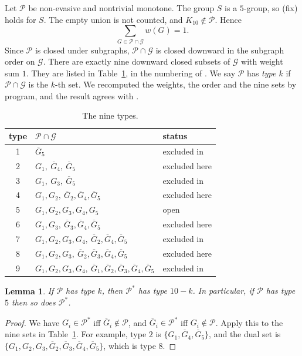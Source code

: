 \documentclass[11pt]{article}
\theoremstyle{plain}
\newtheorem{lemma}[theorem]{Lemma}
\theoremstyle{definition}
\theoremstyle{remark}
\newcommand{\PP}{\mathcal P}
\begin{document}
Let $\PP$ be non-evasive and nontrivial monotone.
The group $S$ is a $5$-group, so (fix) holds for $S$.
The empty union is not counted, and $K_{10}\notin\PP$.
Hence
\begin{equation}\label{eq:sylow}
\sum_{G\in\PP\cap\mathcal G}w(G)=1 .
\end{equation}
Since $\PP$ is closed under subgraphs, $\PP\cap\mathcal G$ is closed downward in the subgraph order on $\mathcal G$.
There are exactly nine downward closed subsets of $\mathcal G$ with weight sum $1$.
They are listed in Table~\ref{tab:types}, in the numbering of \cite[\S5]{AB}.
We say $\PP$ has \emph{type $k$} if $\PP\cap\mathcal G$ is the $k$-th set.
We recomputed the weights, the order and the nine sets by program, and the result agrees with \cite{AB}.

\begin{table}[t]
\centering
\begin{tabular}{cll}
\toprule
type & $\PP\cap\mathcal G$ & status\\
\midrule
1 & $\overline G_5$ & excluded in \cite{AB}\\
2 & $G_1,\ \overline G_4,\ \overline G_5$ & excluded here\\
3 & $G_1,\ G_3,\ \overline G_5$ & excluded in \cite{AB}\\
4 & $G_1,G_2,\ \overline G_2,\overline G_4,\overline G_5$ & excluded here\\
5 & $G_1,G_2,G_3,G_4,G_5$ & open\\
6 & $G_1,G_3,\ \overline G_3,\overline G_4,\overline G_5$ & excluded here\\
7 & $G_1,G_2,G_3,G_4,\ \overline G_2,\overline G_4,\overline G_5$ & excluded in \cite{AB}\\
8 & $G_1,G_2,G_3,\ \overline G_2,\overline G_3,\overline G_4,\overline G_5$ & excluded here\\
9 & $G_1,G_2,G_3,G_4,\ \overline G_1,\overline G_2,\overline G_3,\overline G_4,\overline G_5$ & excluded in \cite{AB}\\
\bottomrule
\end{tabular}
\caption{The nine types.}\label{tab:types}
\end{table}

\begin{lemma}\label{lem:typedual}
If $\PP$ has type $k$, then $\PP^*$ has type $10-k$.
In particular, if $\PP$ has type~$5$ then so does $\PP^*$.
\end{lemma}

\begin{proof}
We have $G_i\in\PP^*$ iff $\overline G_i\notin\PP$, and $\overline G_i\in\PP^*$ iff $G_i\notin\PP$.
Apply this to the nine sets in Table~\ref{tab:types}.
For example, type $2$ is $\{G_1,\overline G_4,\overline G_5\}$, and the dual set is $\{G_1,G_2,G_3,\overline G_2,\overline G_3,\overline G_4,\overline G_5\}$, which is type $8$.
\end{proof}
\end{document}
